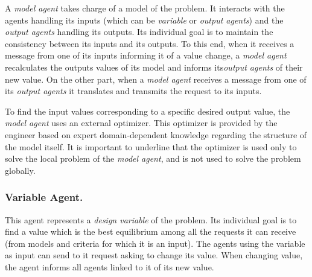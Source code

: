 A \emph{model agent} takes charge of a model of the problem. It interacts with the agents handling its inputs (which can be \emph{variable} or \emph{output agents}) and the \emph{output agents} handling its outputs. Its individual goal is to maintain the consistency between its inputs and its outputs. To this end, when it receives a message from one of its inputs informing it of a value change, a \emph{model agent} recalculates the outputs values of its model and informs its\emph{output agents} of their new value. On the other part, when a \emph{model agent} receives a message from one of its \emph{output agents} it translates and transmits the request to its inputs. 

To find the input values corresponding to a specific desired output value, the \emph{model agent} uses an external optimizer. This optimizer is provided by the engineer based on expert domain-dependent knowledge regarding the structure of the model itself.
It is important to underline that the optimizer is used only to solve the local problem of the \emph{model agent}, and is  not used to solve the problem globally.



\subsubsection*{Variable Agent.}

This agent represents a \emph{design variable} of the problem. Its individual goal is to find a value which is the best equilibrium among all the requests it can receive (from models and criteria for which it is an input). The agents using the variable as input can send to it request asking to change its value. When changing value, the agent informs all agents linked to it of its new value. 


